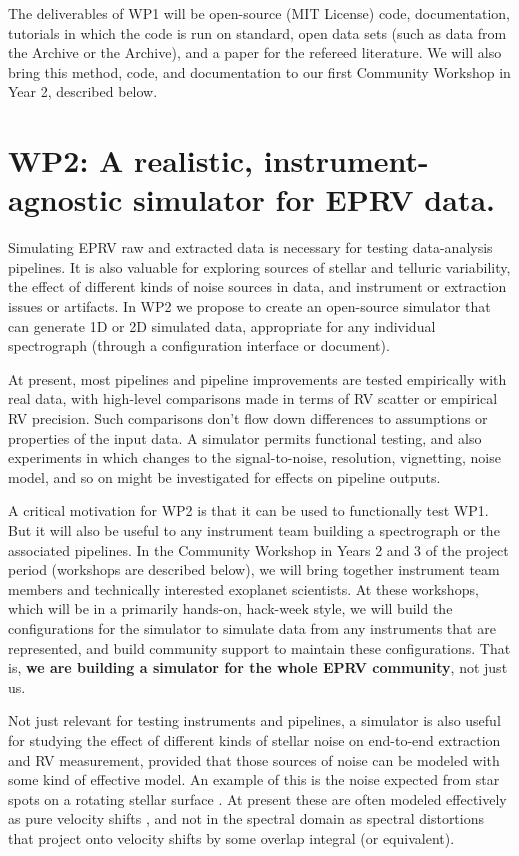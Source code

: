 \documentclass[12pt]{article}
\begin{document}
The deliverables of WP1 will be open-source (MIT License) code, documentation, tutorials in which the code is run on standard, open data sets (such as data from the  Archive or the  Archive), and a paper for the refereed literature.
We will also bring this method, code, and documentation to our first Community Workshop in Year 2, described below.

\section{WP2: A realistic, instrument-agnostic simulator for EPRV data.}
Simulating EPRV raw and extracted data is necessary for testing data-analysis pipelines.
It is also valuable for exploring sources of stellar and telluric variability, the effect of different kinds of noise sources in data, and instrument or extraction issues or artifacts.
In WP2 we propose to create an open-source simulator that can generate 1D or 2D simulated data, appropriate for any individual spectrograph (through a configuration interface or document).

At present, most pipelines and pipeline improvements are tested empirically with real data, with high-level comparisons made in terms of RV scatter or empirical RV precision.
Such comparisons don't flow down differences to assumptions or properties of the input data.
A simulator permits functional testing, and also experiments in which changes to the signal-to-noise, resolution, vignetting, noise model, and so on might be investigated for effects on pipeline outputs.

A critical motivation for WP2 is that it can be used to functionally test WP1.
But it will also be useful to any instrument team building a spectrograph or the associated pipelines.
In the Community Workshop in Years 2 and 3 of the project period (workshops are described below), we will bring together instrument team members and technically interested exoplanet scientists.
At these workshops, which will be in a primarily hands-on, hack-week style, we will build the configurations for the simulator to simulate data from any instruments that are represented, and build community support to maintain these configurations.
That is, \textbf{we are building a simulator for the whole EPRV community}, not just us.

Not just relevant for testing instruments and pipelines, a simulator is also useful for studying the effect of different kinds of stellar noise on end-to-end extraction and RV measurement, provided that those sources of noise can be modeled with some kind of effective model.
An example of this is the noise expected from star spots on a rotating stellar surface \cite{soap, starry}.
At present these are often modeled effectively as pure velocity shifts \cite{Aigrain}, and not in the spectral domain as spectral distortions that project onto velocity shifts by some overlap integral (or equivalent).
\end{document}
